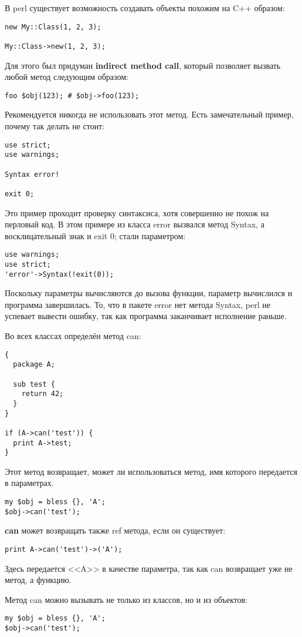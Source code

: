 В perl существует возможность создавать объекты похожим на C++ образом:
\begin{verbatim}
new My::Class(1, 2, 3);

My::Class->new(1, 2, 3);
\end{verbatim}
Для этого был придуман \textbf{indirect method call}, который позволяет вызвать любой метод следующим образом:
\begin{verbatim}
foo $obj(123); # $obj->foo(123);
\end{verbatim}
Рекомендуется никогда не использовать этот метод. Есть замечательный пример, почему так делать не стоит:
\begin{verbatim}
use strict;
use warnings;

Syntax error!

exit 0;
\end{verbatim}
Это пример проходит проверку синтаксиса, хотя совершенно не похож на перловый код. В этом примере из класса error вызвался метод Syntax, а восклицательный знак и exit 0; стали параметром:
\begin{verbatim}
use warnings;
use strict;
'error'->Syntax(!exit(0));
\end{verbatim}
Поскольку параметры вычисляются до вызова функции, параметр вычислился и программа завершилась. То, что в пакете error нет метода Syntax, perl не успевает вывести ошибку, так как программа заканчивает исполнение раньше.

Во всех классах определён метод can:
\begin{verbatim}
{
  package A;

  sub test {
    return 42;
  }
}

if (A->can('test')) {
  print A->test;
}
\end{verbatim}
Этот метод возвращает, может ли использоваться метод, имя которого передается в параметрах.
\begin{verbatim}
my $obj = bless {}, 'A';
$obj->can('test');
\end{verbatim}
\textbf{can} может возвращать также ref метода, если он существует:
\begin{verbatim}
print A->can('test')->('A');
\end{verbatim}
Здесь передается <<A>> в качестве параметра, так как can возвращает уже не метод, а функцию.

Метод can можно вызывать не только из классов, но и из объектов:
\begin{verbatim}
my $obj = bless {}, 'A';
$obj->can('test');
\end{verbatim}

